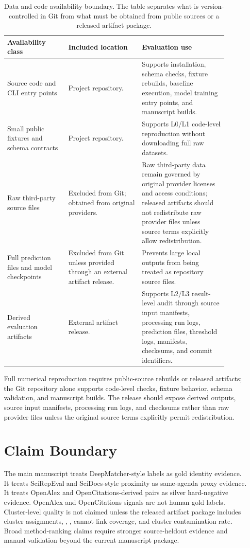 \documentclass[11pt]{article}
\begin{document}
\begin{table}[H]
\caption{Data and code availability boundary. The table separates what is version-controlled in Git from what must be obtained from public sources or a released artifact package.}
\label{tab:data-code-availability-boundary}
\centering
\footnotesize
\setlength{\tabcolsep}{3pt}
\begin{tabular}{L{0.25\linewidth}L{0.30\linewidth}L{0.35\linewidth}}
\toprule
Availability class & Included location & Evaluation use \\
\midrule
Source code and CLI entry points & Project repository. & Supports installation, schema checks, fixture rebuilds, baseline execution, model training entry points, and manuscript builds. \\
Small public fixtures and schema contracts & Project repository. & Supports L0/L1 code-level reproduction without downloading full raw datasets. \\
Raw third-party source files & Excluded from Git; obtained from original providers. & Raw third-party data remain governed by original provider licenses and access conditions; released artifacts should not redistribute raw provider files unless source terms explicitly allow redistribution. \\
Full prediction files and model checkpoints & Excluded from Git unless provided through an external artifact release. & Prevents large local outputs from being treated as repository source files. \\
Derived evaluation artifacts & External artifact release. & Supports L2/L3 result-level audit through source input manifests, processing run logs, prediction files, threshold logs, manifests, checksums, and commit identifiers. \\
\bottomrule
\end{tabular}
\end{table}

Full numerical reproduction requires public-source rebuilds or released artifacts; the Git repository alone supports code-level checks, fixture behavior, schema validation, and manuscript builds. The release should expose derived outputs, source input manifests, processing run logs, and checksums rather than raw provider files unless the original source terms explicitly permit redistribution.

\section{Claim Boundary}

The main manuscript treats DeepMatcher-style labels as gold identity evidence. It treats SciRepEval and SciDocs-style proximity as same-agenda proxy evidence. It treats OpenAlex and OpenCitations-derived pairs as silver hard-negative evidence. OpenAlex and OpenCitations signals are not human gold labels. Cluster-level quality is not claimed unless the released artifact package includes cluster assignments, , , cannot-link coverage, and cluster contamination rate. Broad method-ranking claims require stronger source-heldout evidence and manual validation beyond the current manuscript package.
\end{document}
